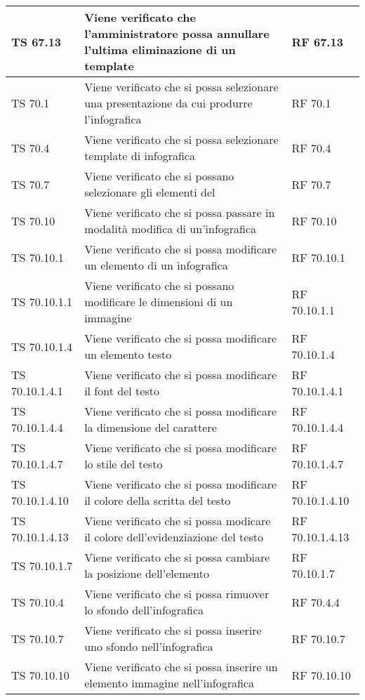 {{\begin{longtable} [c]{| p{3cm} | p{6cm} |p{3cm}|}
			TS 67.13 & Viene verificato che l'amministratore possa annullare l'ultima eliminazione di un template & RF 67.13\\
			\hline
			TS 70.1 & Viene verificato che si possa selezionare una presentazione da cui produrre l'infografica  & RF 70.1\\
			\hline
			TS 70.4 & Viene verificato che si possa selezionare template di infografica & RF 70.4\\
			\hline
			TS 70.7 & Viene verificato che si possano selezionare gli elementi del  & RF 70.7\\
			\hline
			TS 70.10 & Viene verificato che si possa passare in modalità modifica di un'infografica & RF 70.10\\
			\hline
			TS 70.10.1 & Viene verificato che si possa modificare un elemento di un infografica & RF 70.10.1\\
			\hline
			TS 70.10.1.1 & Viene verificato che si possano modificare le dimensioni di un immagine & RF 70.10.1.1\\
			\hline
			TS 70.10.1.4 & Viene verificato che si possa modificare un elemento testo  & RF 70.10.1.4\\
			\hline
			TS 70.10.1.4.1 & Viene verificato che si possa modificare il font del testo & RF 70.10.1.4.1\\
			\hline
			TS 70.10.1.4.4 & Viene verificato che si possa modificare la dimensione del carattere & RF 70.10.1.4.4\\
			\hline
			TS 70.10.1.4.7 & Viene verificato che si possa modificare lo stile del testo & RF 70.10.1.4.7\\
			\hline
			TS 70.10.1.4.10 & Viene verificato che si possa modificare il colore della scritta del testo & RF 70.10.1.4.10\\
			\hline
			TS 70.10.1.4.13 & Viene verificato che si possa modicare il colore dell'evidenziazione del testo & RF 70.10.1.4.13\\
			\hline
			TS 70.10.1.7 & Viene verificato che si possa cambiare la posizione dell'elemento & RF 70.10.1.7\\
			\hline
			TS 70.10.4 & Viene verificato che si possa rimuover lo sfondo dell'infografica & RF 70.4.4\\
			\hline
			TS 70.10.7 & Viene verificato che si possa inserire uno sfondo nell'infografica & RF 70.10.7\\
			\hline
			TS 70.10.10 & Viene verificato che si possa inserire un elemento immagine nell'infografica & RF 70.10.10\\

\end{longtable}}}
